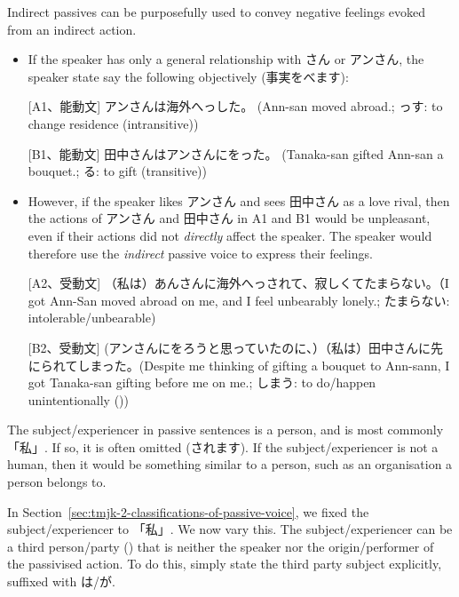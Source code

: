 \documentclass[../nihongo-gakushuu-kyouzai.tex]{subfiles}
\begin{document}
Indirect passives can be purposefully used to convey negative feelings evoked from an indirect action.
\begin{itemize}
    \item If the speaker has only a general relationship with さん or アンさん, the speaker state say the following objectively (事実をべます):

    [A1、能動文] アンさんは海外へっした。 (Ann-san moved abroad.; っす: to change residence (intransitive))

    [B1、能動文] 田中さんはアンさんにをった。 (Tanaka-san gifted Ann-san a bouquet.; る: to gift (transitive))
    \item However, if the speaker likes アンさん and sees 田中さん as a love rival, then the actions of アンさん and 田中さん in A1 and B1 would be unpleasant, even if their actions did not \emph{directly} affect the speaker. The speaker would therefore use the \emph{indirect} passive voice to express their feelings.

    [A2、受動文] （私は）あんさんに海外へっされて、寂しくてたまらない。（I got Ann-San moved abroad on me, and I feel unbearably lonely.; たまらない: intolerable/unbearable)

    [B2、受動文] (アンさんにをろうと思っていたのに、）（私は）田中さんに先にられてしまった。(Despite me thinking of gifting a bouquet to Ann-sann, I got Tanaka-san gifting before me on me.; しまう: to do/happen unintentionally (\aux))
\end{itemize}
The subject/experiencer in passive sentences is a person, and is most commonly 「私」. If so, it is often omitted (されます). If the subject/experiencer is not a human, then it would be something similar to a person, such as an organisation a person belongs to.

In Section~\ref{sec:tmjk-2-classifications-of-passive-voice}, we fixed the subject/experiencer to 「私」. We now vary this. The subject/experiencer can be a third person/party () that is neither the speaker nor the origin/performer of the passivised action. To do this, simply state the third party subject explicitly, suffixed with は/が.
\end{document}
